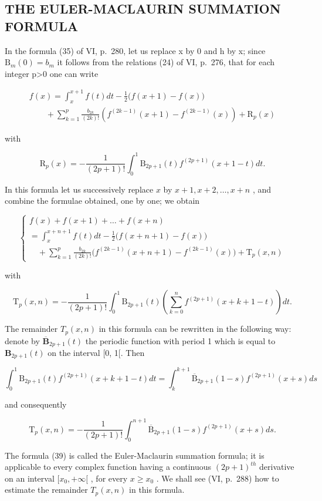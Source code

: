 \subsection{THE EULER-MACLAURIN SUMMATION FORMULA}

In the formula (35) of VI, p.~280, let us replace x by 0 and h by x; since \(\mathrm{B}_{m}(0)=b_{m}\) it follows from the relations (24) of VI, p.~276, that for each integer p\textgreater0 one can write

\[
\begin{array}{l} f (x) = \int_ {x} ^ {x + 1} f (t) d t - \frac {1}{2} \big (f (x + 1) - f (x) \big) \\ \qquad + \sum_ {k = 1} ^ {p} \frac {b _ {2 k}}{(2 k) !} \left(f ^ {(2 k - 1)} (x + 1) - f ^ {(2 k - 1)} (x)\right) + \mathrm{R} _ {p} (x) \end{array}\tag{37}
\]

with

\[
\mathrm{R} _ {p} (x) = - \frac {1}{(2 p + 1) !} \int_ {0} ^ {1} \mathrm{B} _ {2 p + 1} (t) f ^ {(2 p + 1)} (x + 1 - t) d t.\tag{38}
\]

In this formula let us successively replace \(x\) by \(x + 1, x + 2, \ldots, x + n\) , and combine the formulae obtained, one by one; we obtain

\[
\left\{ \begin{array}{l} f (x) + f (x + 1) + \dots + f (x + n) \\ = \int_ {x} ^ {x + n + 1} f (t) d t - \frac {1}{2} \bigl (f (x + n + 1) - f (x) \bigr) \\ \quad + \sum_ {k = 1} ^ {p} \frac {b _ {2 k}}{(2 k) !} \bigl (f ^ {(2 k - 1)} (x + n + 1) - f ^ {(2 k - 1)} (x) \bigr) + \mathrm{T} _ {p} (x, n) \end{array} \right.\tag{39}
\]

with

\[
\mathrm{T} _ {p} (x, n) = - \frac {1}{(2 p + 1) !} \int_ {0} ^ {1} \mathrm{B} _ {2 p + 1} (t) \left(\sum_ {k = 0} ^ {n} f ^ {(2 p + 1)} (x + k + 1 - t)\right) d t.\tag{40}
\]

The remainder \(T_{p}(x,n)\) in this formula can be rewritten in the following way: denote by \(\overline{\mathbf{B}}_{2p+1}(t)\) the periodic function with period 1 which is equal to \(\mathbf{B}_{2p+1}(t)\) on the interval {[}0, 1{[}. Then

\[
\int_ {0} ^ {1} \mathrm{B} _ {2 p + 1} (t) f ^ {(2 p + 1)} (x + k + 1 - t) d t = \int_ {k} ^ {k + 1} \overline {{\mathrm{B}}} _ {2 p + 1} (1 - s) f ^ {(2 p + 1)} (x + s) d s
\]

and consequently

\[
\mathrm{T} _ {p} (x, n) = - \frac {1}{(2 p + 1) !} \int_ {0} ^ {n + 1} \overline {{\mathrm{B}}} _ {2 p + 1} (1 - s) f ^ {(2 p + 1)} (x + s) d s.\tag{41}
\]

The formula (39) is called the Euler-Maclaurin summation formula; it is applicable to every complex function having a continuous \((2p+1)^{th}\) derivative on an interval \([x_{0},+\infty[\) , for every \(x\geqslant x_{0}\) . We shall see (VI, p.~288) how to estimate the remainder \(T_{p}(x,n)\) in this formula.

